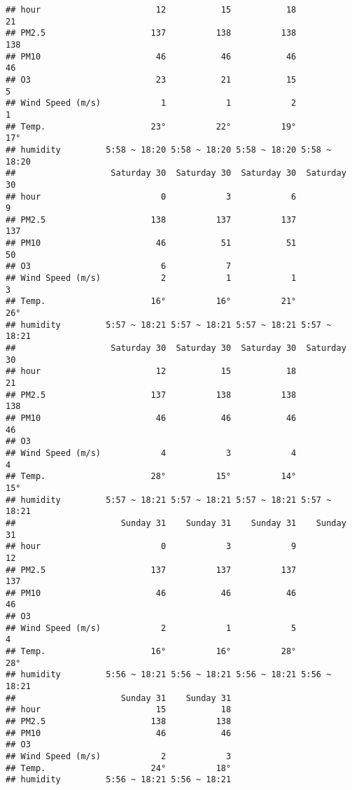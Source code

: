 \documentclass[
]{article}
\begin{document}
\begin{verbatim}
## hour                       12           15           18           21
## PM2.5                     137          138          138          138
## PM10                       46           46           46           46
## O3                         23           21           15            5
## Wind Speed (m/s)            1            1            2            1
## Temp.                     23°          22°          19°          17°
## humidity         5:58 ~ 18:20 5:58 ~ 18:20 5:58 ~ 18:20 5:58 ~ 18:20
##                   Saturday 30  Saturday 30  Saturday 30  Saturday 30
## hour                        0            3            6            9
## PM2.5                     138          137          137          137
## PM10                       46           51           51           50
## O3                          6            7                          
## Wind Speed (m/s)            2            1            1            3
## Temp.                     16°          16°          21°          26°
## humidity         5:57 ~ 18:21 5:57 ~ 18:21 5:57 ~ 18:21 5:57 ~ 18:21
##                   Saturday 30  Saturday 30  Saturday 30  Saturday 30
## hour                       12           15           18           21
## PM2.5                     137          138          138          138
## PM10                       46           46           46           46
## O3                                                                  
## Wind Speed (m/s)            4            3            4            4
## Temp.                     28°          15°          14°          15°
## humidity         5:57 ~ 18:21 5:57 ~ 18:21 5:57 ~ 18:21 5:57 ~ 18:21
##                     Sunday 31    Sunday 31    Sunday 31    Sunday 31
## hour                        0            3            9           12
## PM2.5                     137          137          137          137
## PM10                       46           46           46           46
## O3                                                                  
## Wind Speed (m/s)            2            1            5            4
## Temp.                     16°          16°          28°          28°
## humidity         5:56 ~ 18:21 5:56 ~ 18:21 5:56 ~ 18:21 5:56 ~ 18:21
##                     Sunday 31    Sunday 31
## hour                       15           18
## PM2.5                     138          138
## PM10                       46           46
## O3                                        
## Wind Speed (m/s)            2            3
## Temp.                     24°          18°
## humidity         5:56 ~ 18:21 5:56 ~ 18:21
\end{verbatim}
\end{document}
